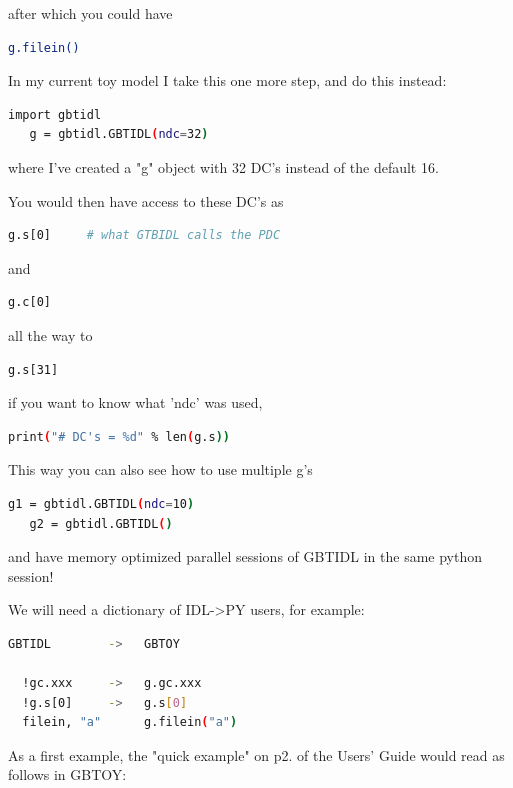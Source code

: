 \documentclass[12pt,a4paper]{article}
\begin{document}
after which you could have

\begin{lstlisting}[language=bash]
   g.filein()
\end{lstlisting}

In my current toy model I take this one more step, and do this instead:

\begin{lstlisting}[language=bash]
   import gbtidl
   g = gbtidl.GBTIDL(ndc=32)
\end{lstlisting}

where I've created a "g" object with 32 DC's instead of the default 16.

You would then have access to these DC's as
\begin{lstlisting}[language=bash]
   g.s[0]     # what GTBIDL calls the PDC
\end{lstlisting}
and
\begin{lstlisting}[language=bash]
   g.c[0]
\end{lstlisting}
   
all the way to

\begin{lstlisting}[language=bash]
   g.s[31]
\end{lstlisting}

if you want to know what 'ndc' was used,

\begin{lstlisting}[language=bash]
   print("# DC's = %d" % len(g.s))
\end{lstlisting}

This way you can also see how to use multiple g's

\begin{lstlisting}[language=bash]
   g1 = gbtidl.GBTIDL(ndc=10)
   g2 = gbtidl.GBTIDL()
\end{lstlisting}

and have memory optimized parallel sessions of GBTIDL in the same
python session!

We will need a dictionary of IDL->PY users, for example:

\begin{lstlisting}[language=bash]
GBTIDL        ->   GBTOY

  !gc.xxx     ->   g.gc.xxx
  !g.s[0]     ->   g.s[0]
  filein, "a"      g.filein("a")
\end{lstlisting}

As a first example, the "quick example" on p2. of the Users' Guide would
read as follows in GBTOY:
\end{document}
